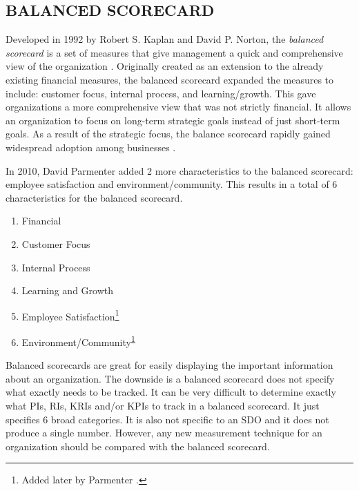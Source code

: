 \documentclass[SDSUThesis.tex]{subfiles}
\begin{document}
    \subsection{BALANCED SCORECARD}
    \label{sec:bsc}
    
        Developed in 1992 by Robert S. Kaplan and David P. Norton, the 
        \textit{balanced scorecard}  is a set of measures that
        give management a quick and comprehensive view of the
        organization \cite{kaplan1992}.  Originally created as an
        extension to the already existing financial measures, the
        balanced scorecard expanded the measures to include: 
        customer focus, internal process, and learning/growth. 
        This gave organizations a more comprehensive view that was
        not strictly financial.  It allows an organization to focus
        on long-term strategic goals instead of just short-term goals.
        As a result of the strategic focus, the balance scorecard
        rapidly gained widespread adoption
        among businesses \cite{Kaplan2007}.  
        
        In 2010, David Parmenter \cite{parmenter2010} added 2 more
        characteristics to the balanced scorecard: employee satisfaction
        and environment/community.  This results in a total of 6 
        characteristics for the balanced scorecard.
        \begin{enumerate}
          \item Financial 
          \item Customer Focus
          \item Internal Process
          \item Learning and Growth
          \item Employee Satisfaction\footnote{\label{ft:bsc} Added 
          later by Parmenter \cite{parmenter2010}. }
          \item Environment/Community\textsuperscript{\ref{ft:bsc}}
        \end{enumerate}
        
        Balanced scorecards are great for easily displaying the 
        important information about
        an organization.  The downside is a balanced scorecard does not specify what
        exactly needs to be tracked. It can be very difficult to determine exactly
        what PIs, RIs, KRIs and/or KPIs to track in a balanced scorecard. 
        It just specifies 6 broad categories.
        It is also not specific to an SDO and 
        it does not produce a single number.  However, any new measurement
        technique for an organization should be compared with the balanced
        scorecard.  
\end{document}
